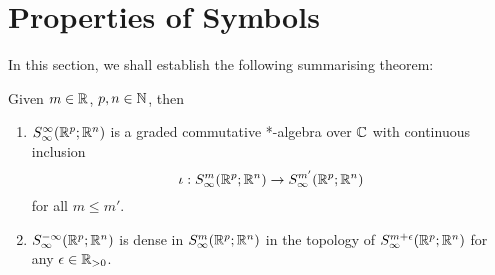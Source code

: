\documentclass[12pt]{article}
\begin{document}
\begin{example}
\end{example}



\section{Properties of Symbols}
In this section, we shall establish the following summarising theorem: 

\begin{ftheorem}[Summary]
    Given $m \in {\ensuremath {\mathbb R}}$, $p, n \in {\ensuremath {\mathbb N}}$, then
    \begin{enumerate}
        \item $S^{\infty}_\infty({\mathbb R}^{p}; {\mathbb R}^n)$ is a graded commutative *-algebra over ${\mathbb C}$ with continuous  inclusion  $$\iota : S^{m}_\infty({\mathbb R}^p; {\mathbb R}^n) \to S^{m'}_\infty({\mathbb R}^p; {\mathbb R}^n)$$ for all $m \leq m'$. 
        \item $S^{-\infty}_\infty({\mathbb R}^{p}; {\mathbb R}^n)$ is dense in $S^{m}_\infty({\mathbb R}^{p}; {\mathbb R}^n)$ in the topology of $S^{m + \epsilon}_\infty({\mathbb R}^{p}; {\mathbb R}^n)$ for any $\epsilon \in {\ensuremath {\mathbb R}}_{> 0}$. 
    \end{enumerate}
    
\end{ftheorem}


\end{document}
